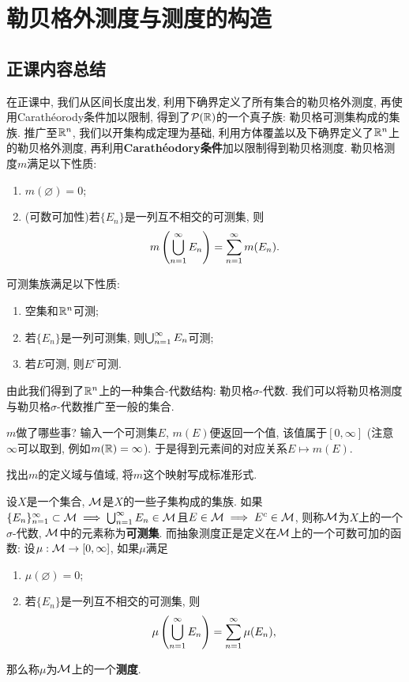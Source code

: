 \section{勒贝格外测度与测度的构造}
\subsection{正课内容总结}
在正课中, 我们从区间长度出发, 利用下确界定义了所有集合的勒贝格外测度, 再使用Carath\'eorody条件加以限制, 得到了$\mathcal{P}(\mathbb{R})$的一个真子族: 勒贝格可测集构成的集族. 推广至$\mathbb{R}^n$, 我们以开集构成定理为基础, 利用方体覆盖以及下确界定义了$\mathbb{R}^n$上的勒贝格外测度, 再利用\textbf{Carath\'eodory条件}加以限制得到勒贝格测度. 勒贝格测度$m$满足以下性质:
\begin{enumerate}
    \item  $m(\varnothing) = 0$;
    \item (可数可加性)若$\{E_n\}$是一列互不相交的可测集, 则
    $$m\left(\bigcup_{n=1}^{\infty}E_n\right) = \sum_{n=1}^{\infty}m(E_n).$$
\end{enumerate}
可测集族满足以下性质:
\begin{enumerate}
    \item 空集和$\mathbb{R}^n$可测;
    \item 若$\{E_n\}$是一列可测集, 则$\bigcup_{n=1}^{\infty}E_n$可测;
    \item 若$E$可测, 则$E^c$可测.
\end{enumerate}
由此我们得到了$\mathbb{R}^n$上的一种集合-代数结构: 勒贝格$\sigma$-代数. 我们可以将勒贝格测度与勒贝格$\sigma$-代数推广至一般的集合. 

$m$做了哪些事? 输入一个可测集$E$, $m(E)$便返回一个值, 该值属于$[0,\infty]$ (注意$\infty$可以取到, 例如$m(\mathbb{R}) = \infty$). 
于是得到元素间的对应关系$E \mapsto m(E)$. 
\begin{exercise}
    找出$m$的定义域与值域, 将$m$这个映射写成标准形式. 
\end{exercise}
设$X$是一个集合, $\mathcal{M}$是$X$的一些子集构成的集族. 如果$\{E_n\}_{n=1}^\infty \subset \mathcal{M} \implies \bigcup_{n=1}^{\infty}E_n \in \mathcal{M}$且$E \in \mathcal{M} \implies E^c \in \mathcal{M}$, 则称$\mathcal{M}$为$X$上的一个$\sigma$-代数, $\mathcal{M}$中的元素称为\textbf{可测集}. 
而抽象测度正是定义在$\mathcal{M}$上的一个可数可加的函数: 设$\mu: \mathcal{M} \to [0, \infty]$, 如果$\mu$满足
\begin{enumerate}
    \item $\mu(\varnothing) = 0$;
    \item 若$\{E_n\}$是一列互不相交的可测集, 则
    $$\mu\left(\bigcup_{n=1}^{\infty}E_n\right) = \sum_{n=1}^{\infty}\mu(E_n),$$
\end{enumerate}
那么称$\mu$为$\mathcal{M}$上的一个\textbf{测度}.

